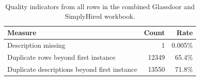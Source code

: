 \begin{table}[t]
  \caption{Quality indicators from all rows in the combined Glassdoor and SimplyHired workbook.}
  \label{tab:job-ads-quality}
  \centering
  \small
  \begin{tabular}{lrr}
    \toprule
    Measure & Count & Rate \\
    \midrule
    Description missing & 1 & 0.005\% \\
    Duplicate rows beyond first instance & 12349 & 65.4\% \\
    Duplicate descriptions beyond first instance & 13550 & 71.8\% \\
    \bottomrule
  \end{tabular}
\end{table}
